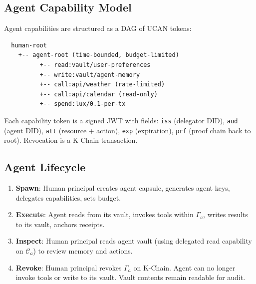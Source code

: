 \subsection{Agent Capability Model}

Agent capabilities are structured as a DAG of UCAN tokens:

\begin{verbatim}
  human-root
    +-- agent-root (time-bounded, budget-limited)
          +-- read:vault/user-preferences
          +-- write:vault/agent-memory
          +-- call:api/weather (rate-limited)
          +-- call:api/calendar (read-only)
          +-- spend:lux/0.1-per-tx
\end{verbatim}

Each capability token is a signed JWT with fields: \texttt{iss} (delegator DID),
\texttt{aud} (agent DID), \texttt{att} (resource + action), \texttt{exp}
(expiration), \texttt{prf} (proof chain back to root). Revocation is a K-Chain
transaction.

\subsection{Agent Lifecycle}

\begin{enumerate}[nosep]
  \item \textbf{Spawn}: Human principal creates agent capsule, generates agent
        keys, delegates capabilities, sets budget.
  \item \textbf{Execute}: Agent reads from its vault, invokes tools within
        $\Gamma_a$, writes results to its vault, anchors receipts.
  \item \textbf{Inspect}: Human principal reads agent vault (using delegated
        read capability on $\mathcal{C}_a$) to review memory and actions.
  \item \textbf{Revoke}: Human principal revokes $\Gamma_a$ on K-Chain.
        Agent can no longer invoke tools or write to its vault. Vault contents
        remain readable for audit.
\end{enumerate}

